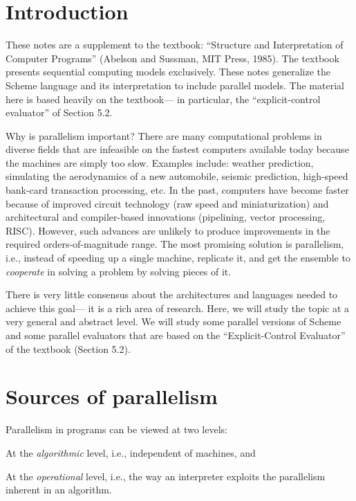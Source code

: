 
\section{Introduction}

These notes are a supplement to the textbook: ``Structure and
Interpretation of Computer Programs'' (Abelson and Sussman, MIT Press,
1985).  The textbook presents sequential computing models exclusively.
These notes generalize the Scheme language and its interpretation to
include parallel models.  The material here is based heavily on the
textbook--- in particular, the ``explicit-control evaluator'' of
Section 5.2.

Why is parallelism important?  There are many computational problems
in diverse fields that are infeasible on the fastest computers
available today because the machines are simply too slow.  Examples
include: weather prediction, simulating the aerodynamics of a new
automobile, seismic prediction, high-speed bank-card transaction
processing, etc.  In the past, computers have become faster because of
improved circuit technology (raw speed and miniaturization) and
architectural and compiler-based innovations (pipelining, vector
processing, RISC).  However, such advances are unlikely to produce
improvements in the required orders-of-magnitude range.  The most
promising solution is parallelism, i.e., instead of speeding up a
single machine, replicate it, and get the ensemble to {\em
cooperate\/} in solving a problem by solving pieces of it.

There is very little consensus about the architectures and languages
needed to achieve this goal--- it is a rich area of research.  Here,
we will study the topic at a very general and abstract level.  We will
study some parallel versions of Scheme and some parallel evaluators
that are based on the ``Explicit-Control Evaluator'' of the textbook
(Section 5.2).


\section{Sources of parallelism}

Parallelism in programs can be viewed at two levels:
\begin{tightlist}

\item At the {\em algorithmic\/} level, i.e., independent of machines, and

\item At the {\em operational\/} level, i.e., the way an interpreter
exploits the parallelism inherent in an algorithm.

\end{tightlist}

